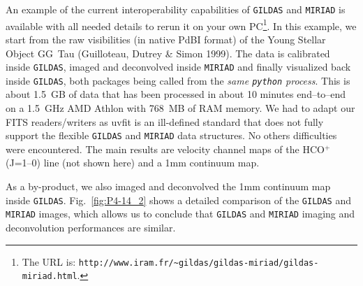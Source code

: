 \documentclass[11pt,twoside]{article}  %
\newcommand{\GILDAS}{\texttt{GILDAS}}
\newcommand{\MIRIAD}{\texttt{MIRIAD}}
\newcommand{\python}{\texttt{python}}
\newcommand{\PdBI}{\textrm{PdBI}}
\newcommand{\HCOp} {\mbox{HCO$^{+}$}} %
\newcommand{\Jone}{\mbox{(J=1--0)}}
\begin{document}
An example of the current interoperability capabilities of \GILDAS{} and
\MIRIAD{} is available with all needed details to rerun it on your own
PC\footnote{The URL is:
  \texttt{http://www.iram.fr/\~{}gildas/gildas-miriad/gildas-miriad.html}.}.
In this example, we start from the raw visibilities (in native \PdBI{}
format) of the Young Stellar Object GG~Tau (Guilloteau, Dutrey \& Simon
1999). The data is calibrated inside \GILDAS{}, imaged and deconvolved
inside \MIRIAD{} and finally visualized back inside \GILDAS{}, both
packages being called from the \emph{same \python{} process}. This is about
1.5~GB of data that has been processed in about 10 minutes end--to--end on
a 1.5~GHz AMD Athlon with 768~MB of RAM memory. We had to adapt our FITS
readers/writers as uvfit is an ill-defined standard that does not fully
support the flexible \GILDAS{} and \MIRIAD{} data structures. No others
difficulties were encountered. The main results are velocity channel maps
of the \HCOp{} \Jone{} line (not shown here) and a 1mm continuum map.

As a by-product, we also imaged and deconvolved the 1mm continuum map
inside \GILDAS{}. Fig.~\ref{fig:P4-14_2} shows a detailed comparison of the
\GILDAS{} and \MIRIAD{} images, which allows us to conclude that \GILDAS{}
and \MIRIAD{} imaging and deconvolution performances are similar.
\end{document}
